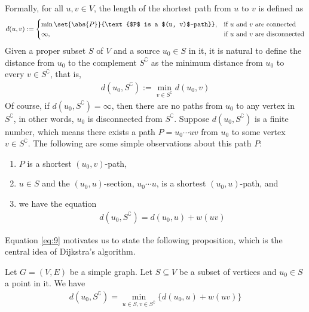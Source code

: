 \documentclass[thmcnt=section, 12pt, color=cyan]{my-elegantbook}
\begin{document}
Formally, for all $u, v \in V$, the length of the shortest path from $u$ to $v$ is defined as 
\begin{align*}
    d(u,v) := 
    \begin{cases}
        \min \set{\abs{P}}{\text{$P$ is a $(u, v)$-path}} ,
        &\text{if $u$ and $v$ are connected} \\ 
        \infty,
        &\text{if $u$ and $v$ are disconnected}
    \end{cases}
\end{align*}
Given a proper subset $S$ of $V$ and a source $u_0 \in S$ in it, it is natural to define the distance from $u_0$ to the complement $S^\complement$ as the minimum distance from $u_0$ to every $v \in S^\complement$, that is,
\begin{align*}
    d(u_0, S^\complement) := \min_{v \in S^\complement} d(u_0, v)
\end{align*}
Of course, if $d(u_0, S^\complement) = \infty$, then there are no paths from $u_0$ to any vertex in $S^\complement$, in other words, $u_0$ is disconnected from $S^\complement$. Suppose $d(u_0, S^\complement)$ is a finite number, which means there exists a path $P = u_0 \cdots u v$ from $u_0$ to some vertex $v \in S^\complement$. The following are some simple observations about this path $P$:
\begin{enumerate}
    \item $P$ is a shortest $(u_0, v)$-path,
    \item $u \in S$ and the $(u_0, u)$-section, $u_0 \cdots u$, is a shortest $(u_0, u)$-path, and
    \item we have the equation
    \begin{align}
        d(u_0, S^\complement) = d(u_0, u) + w(uv)
        \label{eq:9}
    \end{align}
\end{enumerate}
Equation \eqref{eq:9} motivates us to state the following proposition, which is the central idea of Dijkstra's algorithm.

\begin{proposition} \label{pro:2}
    Let $G = (V, E)$ be a simple graph. Let $S \subseteq V$ be a subset of vertices and $u_0 \in S$ a point in it. We have 
    \begin{align}
        d(u_0, S^\complement)
        = \min_{u \in S, v \in S^\complement} \{
            d(u_0, u) + w(u v)
        \}
        \label{eq:5}
    \end{align}
\end{proposition}
\end{document}
